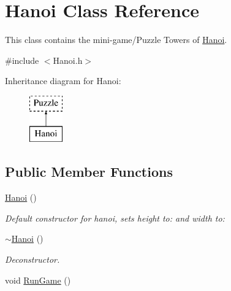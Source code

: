 \hypertarget{classHanoi}{\section{Hanoi Class Reference}
\label{classHanoi}
}


This class contains the mini-\/game/\-Puzzle Towers of \hyperlink{classHanoi}{Hanoi}.  




{\ttfamily \#include $<$Hanoi.\-h$>$}

Inheritance diagram for Hanoi\-:\begin{figure}[H]
\begin{center}
\leavevmode
\includegraphics[height=2.000000cm]{classHanoi}
\end{center}
\end{figure}
\subsection*{Public Member Functions}
\begin{DoxyCompactItemize}
\item 
\hyperlink{classHanoi_a2af453ec21277f20edc002be08f22346}{Hanoi} ()
\begin{DoxyCompactList}\small\item\em Default constructor for hanoi, sets height to\-: and width to\-: \end{DoxyCompactList}\item 
\hyperlink{classHanoi_a59760291bfeda65330ff53c429a4e55b}{$\sim$\-Hanoi} ()
\begin{DoxyCompactList}\small\item\em Deconstructor. \end{DoxyCompactList}\item 
void \hyperlink{classHanoi_a2032169272e11d26ce253e2b264b9f31}{Run\-Game} ()
\end{DoxyCompactItemize}
